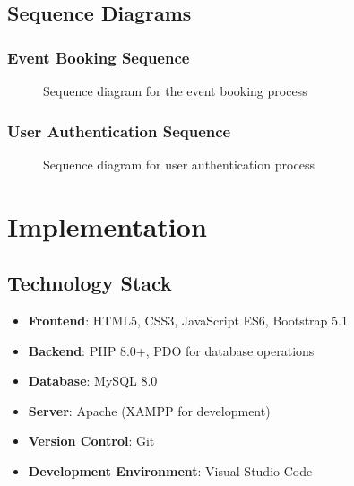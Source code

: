 \documentclass[12pt,a4paper]{article}
\begin{document}
\subsection{Sequence Diagrams}

\subsubsection{Event Booking Sequence}
\begin{figure}[H]
    \centering
    \caption{Sequence diagram for the event booking process}
    \label{fig:booking-sequence}
\end{figure}

\subsubsection{User Authentication Sequence}
\begin{figure}[H]
    \centering
    \caption{Sequence diagram for user authentication process}
    \label{fig:auth-sequence}
\end{figure}

\section{Implementation}

\subsection{Technology Stack}

\begin{tcolorbox}[colback=green!5!white,colframe=green!75!black,title=Technology Overview]
\begin{itemize}
    \item \textbf{Frontend}: HTML5, CSS3, JavaScript ES6, Bootstrap 5.1
    \item \textbf{Backend}: PHP 8.0+, PDO for database operations
    \item \textbf{Database}: MySQL 8.0
    \item \textbf{Server}: Apache (XAMPP for development)
    \item \textbf{Version Control}: Git
    \item \textbf{Development Environment}: Visual Studio Code
\end{itemize}
\end{tcolorbox}
\end{document}
